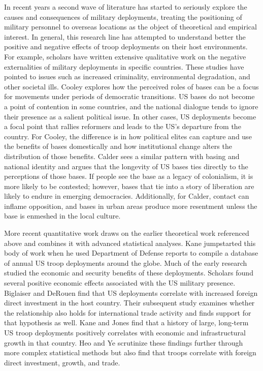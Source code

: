 In recent years a second wave of literature has started to seriously explore the causes and consequences of military deployments, treating the positioning of military personnel to overseas locations as the object of theoretical and empirical interest. In general, this research line has attempted to understand better the positive and negative effects of troop deployments on their host environments. For example, scholars have written extensive qualitative work on the negative externalities of military deployments in specific countries. These studies have pointed to issues such as increased criminality, environmental degradation, and other societal ills.\autocite{Hohn2010,Vine2015,Yeo2011} Cooley explores how the perceived roles of bases can be a focus for movements under periods of democratic transitions.\autocite{Cooley2008} US bases do not become a point of contention in some countries, and the national dialogue tends to ignore their presence as a salient political issue. In other cases, US deployments become a focal point that rallies reformers and leads to the US's departure from the country. For Cooley, the difference is in how political elites can capture and use the benefits of bases domestically and how institutional change alters the distribution of those benefits. Calder sees a similar pattern with basing and national identity and argues that the longevity of US bases ties directly to the perceptions of those bases.\autocite{calder2007} If people see the base as a legacy of colonialism, it is more likely to be contested; however, bases that tie into a story of liberation are likely to endure in emerging democracies. Additionally, for Calder, contact can inflame opposition, and bases in urban areas produce more resentment unless the base is enmeshed in the local culture.  

More recent quantitative work draws on the earlier theoretical work referenced above and combines it with advanced statistical analyses. Kane jumpstarted this body of work when he used Department of Defense reports to compile a database of annual US troop deployments around the globe.\autocite{Kane2004} Much of the early research studied the economic and security benefits of these deployments. Scholars found several positive economic effects associated with the US military presence. Biglaiser and DeRouen find that US deployments correlate with increased foreign direct investment in the host country.\autocite{biglaiserandderouen2007} Their subsequent study examines whether the relationship also holds for international trade activity and finds support for that hypothesis as well.\autocite{biglaiserandderouen2009} Kane and Jones find that a history of large, long-term US troop deployments positively correlates with economic and infrastructural growth in that country.\autocite{Kane2012,JonesKane2012}  Heo and Ye scrutinize these findings further through more complex statistical methods but also find that troops correlate with foreign direct investment, growth, and trade.\autocite{HeoYe2017}


